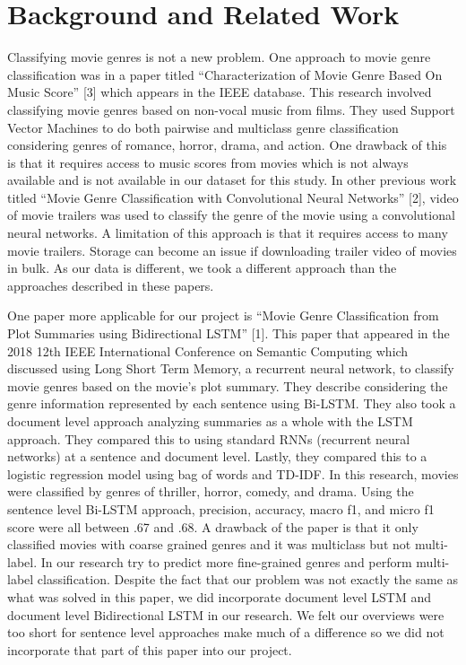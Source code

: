 \documentclass[sigconf]{acmart}
\begin{document}
\section{Background and Related Work}

Classifying movie genres is not a new problem. One approach to movie genre classification was in a paper titled ``Characterization of Movie Genre Based On Music Score'' [3] which appears in the IEEE database.  This research involved classifying movie genres based on non-vocal music from films.  They used Support Vector Machines to do both pairwise and multiclass genre classification considering genres of romance, horror, drama, and action.  One drawback of this is that it requires access to music scores from movies which is not always available and is not available in our dataset for this study.  In other previous work titled ``Movie Genre Classification with Convolutional Neural Networks'' [2], video of movie trailers was used to classify the genre of the movie using a convolutional neural networks. A limitation of this approach is that it requires access to many movie trailers.  Storage can become an issue if downloading trailer video of movies in bulk. As our data is different, we took a different approach than the approaches described in these papers. 

One paper more applicable for our project is ``Movie Genre Classification from Plot Summaries using Bidirectional LSTM'' [1]. This paper that appeared in the 2018 12th IEEE International Conference on Semantic Computing which discussed using Long Short Term Memory, a recurrent neural network, to classify movie genres based on the movie's plot summary.  They describe considering the genre information represented by each sentence using Bi-LSTM. They also took a document level approach analyzing summaries as a whole with the LSTM approach.  They compared this to using standard RNNs (recurrent neural networks) at a sentence and document level.  Lastly, they compared this to a logistic regression model using bag of words and TD-IDF. In this research, movies were classified by genres of thriller, horror, comedy, and drama. Using the sentence level Bi-LSTM approach, precision, accuracy, macro f1, and micro f1 score were all between .67 and .68. A drawback of the paper is that it only classified movies with coarse grained genres and it was multiclass but not multi-label.  In our research try to predict more fine-grained genres and perform multi-label classification. Despite the fact that our problem was not exactly the same as what was solved in this paper, we did incorporate document level LSTM and document level Bidirectional LSTM in our research. We felt our overviews were too short for sentence level approaches make much of a difference so we did not incorporate that part of this paper into our project. 
\end{document}
